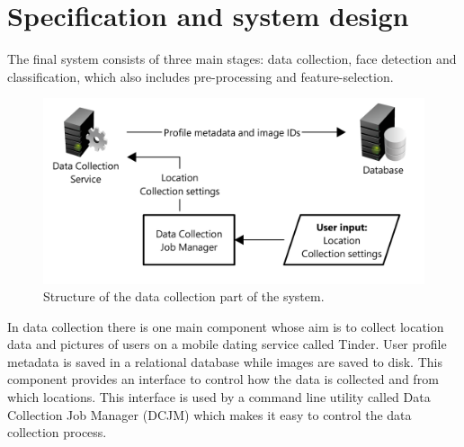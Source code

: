 \chapter{Specification and system design}
\label{spec}
The final system consists of three main stages: data collection, face detection
and classification, which also includes pre-processing and feature-selection.

\begin{figure}
\begin{center}
    \includegraphics[width=\textwidth]{figures/spec/diagram_collection}
\end{center}
\caption{Structure of the data collection part of the system.}
\label{fig:spec:diagram_collection}
\end{figure}

In data collection there is one main component whose aim is to collect location
data and pictures of users on a mobile dating service called Tinder. User
profile metadata is saved in a relational database while images are saved to
disk. This component provides an interface to control how the data is collected
and from which locations. This interface is used by a command line utility
called Data Collection Job Manager (DCJM) which makes it easy to control the data
collection process.

